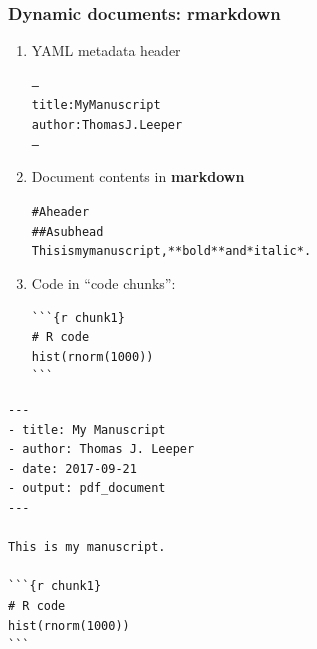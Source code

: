 \documentclass[14pt]{beamer}
\begin{document}
\frame{}


\begin{frame}[fragile]

\frametitle{Dynamic documents: rmarkdown}

\begin{enumerate}\itemsep1em
\item YAML metadata header

\begin{alltt}\footnotesize
---
title: My Manuscript
author: Thomas J. Leeper
---
\end{alltt}


\item Document contents in \textbf{markdown}

\begin{alltt}\footnotesize
\# A header
\#\# A subhead
This is my manuscript, **bold** and *italic*.
\end{alltt}


\item Code in ``code chunks'':

\footnotesize
\begin{verbatim}
```{r chunk1}
# R code
hist(rnorm(1000))
```
\end{verbatim}
\end{enumerate}

\end{frame}


\begin{frame}[fragile]
\begin{verbatim}
---
- title: My Manuscript
- author: Thomas J. Leeper
- date: 2017-09-21
- output: pdf_document
---

This is my manuscript.

```{r chunk1}
# R code
hist(rnorm(1000))
```
\end{verbatim}
\end{frame}


\end{document}
